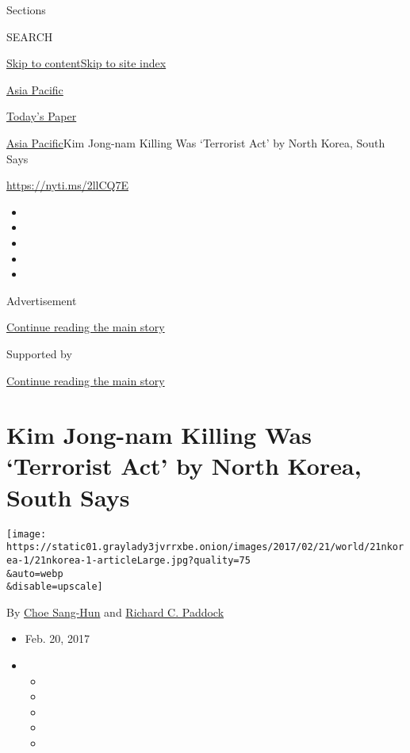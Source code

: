 Sections

SEARCH

\protect\hyperlink{site-content}{Skip to
content}\protect\hyperlink{site-index}{Skip to site index}

\href{https://www.nytimes3xbfgragh.onion/section/world/asia}{Asia
Pacific}

\href{https://myaccount.nytimes3xbfgragh.onion/auth/login?response_type=cookie\&client_id=vi}{}

\href{https://www.nytimes3xbfgragh.onion/section/todayspaper}{Today's
Paper}

\href{/section/world/asia}{Asia Pacific}\textbar{}Kim Jong-nam Killing
Was `Terrorist Act' by North Korea, South Says

\url{https://nyti.ms/2llCQ7E}

\begin{itemize}
\item
\item
\item
\item
\item
\end{itemize}

Advertisement

\protect\hyperlink{after-top}{Continue reading the main story}

Supported by

\protect\hyperlink{after-sponsor}{Continue reading the main story}

\hypertarget{kim-jong-nam-killing-was-terrorist-act-by-north-korea-south-says}{%
\section{Kim Jong-nam Killing Was `Terrorist Act' by North Korea, South
Says}\label{kim-jong-nam-killing-was-terrorist-act-by-north-korea-south-says}}

\texttt{[image: https://static01.graylady3jvrrxbe.onion/images/2017/02/21/world/21nkorea-1/21nkorea-1-articleLarge.jpg?quality=75\\\&auto=webp\\\&disable=upscale]}

By \href{http://www.nytimes3xbfgragh.onion/by/choe-sang-hun}{Choe
Sang-Hun} and
\href{https://www.nytimes3xbfgragh.onion/by/richard-c-paddock}{Richard
C. Paddock}

\begin{itemize}
\item
  Feb. 20, 2017
\item
  \begin{itemize}
  \item
  \item
  \item
  \item
  \item
  \end{itemize}
\end{itemize}

